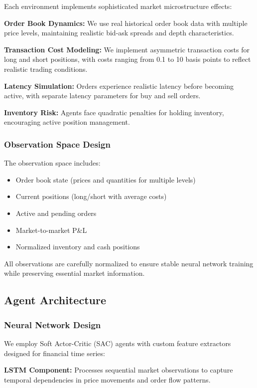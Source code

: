 \documentclass[conference]{IEEEtran}
\begin{document}
Each environment implements sophisticated market microstructure effects:

\textbf{Order Book Dynamics:} We use real historical order book data with multiple price levels, maintaining realistic bid-ask spreads and depth characteristics.

\textbf{Transaction Cost Modeling:} We implement asymmetric transaction costs for long and short positions, with costs ranging from 0.1 to 10 basis points to reflect realistic trading conditions.

\textbf{Latency Simulation:} Orders experience realistic latency before becoming active, with separate latency parameters for buy and sell orders.

\textbf{Inventory Risk:} Agents face quadratic penalties for holding inventory, encouraging active position management.

\subsubsection{Observation Space Design}

The observation space includes:
\begin{itemize}
\item Order book state (prices and quantities for multiple levels)
\item Current positions (long/short with average costs)
\item Active and pending orders
\item Market-to-market P\&L
\item Normalized inventory and cash positions
\end{itemize}

All observations are carefully normalized to ensure stable neural network training while preserving essential market information.

\subsection{Agent Architecture}

\subsubsection{Neural Network Design}

We employ Soft Actor-Critic (SAC) agents with custom feature extractors designed for financial time series:

\textbf{LSTM Component:} Processes sequential market observations to capture temporal dependencies in price movements and order flow patterns.
\end{document}
